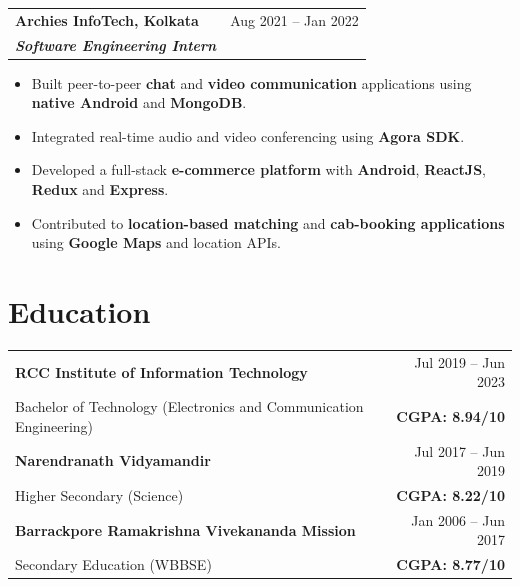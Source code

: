 \documentclass[a4paper,8pt]{article}
\begin{document}
\vspace{6pt}

\begin{tabularx}{\linewidth}{@{} X r @{}}
\textbf{Archies InfoTech, Kolkata} & \color[HTML]{371e77} Aug 2021 -- Jan 2022\\
\textit{\textbf{Software Engineering Intern}} &
\end{tabularx}

\begin{itemize}[leftmargin=2em,itemsep=4pt]
\item Built peer-to-peer \textbf{chat} and \textbf{video communication} applications using \textbf{native Android} and \textbf{MongoDB}.
\item Integrated real-time audio and video conferencing using \textbf{Agora SDK}.
\item Developed a full-stack \textbf{e-commerce platform} with \textbf{Android}, \textbf{ReactJS}, \textbf{Redux} and \textbf{Express}.
\item Contributed to \textbf{location-based matching} and \textbf{cab-booking applications} using \textbf{Google Maps} and location APIs.
\end{itemize}


\vspace{6pt}
\section{Education}

\begin{tabularx}{\linewidth}{@{} X r @{}}
\textbf{RCC Institute of Information Technology} & \color[HTML]{371e77} Jul 2019 -- Jun 2023\\
Bachelor of Technology (Electronics and Communication Engineering) & \textbf{CGPA: 8.94/10}\\[6pt]

\textbf{Narendranath Vidyamandir} & \color[HTML]{371e77} Jul 2017 -- Jun 2019\\
Higher Secondary (Science) & \textbf{CGPA: 8.22/10}\\[6pt]

\textbf{Barrackpore Ramakrishna Vivekananda Mission} & \color[HTML]{371e77} Jan 2006 -- Jun 2017\\
Secondary Education (WBBSE) & \textbf{CGPA: 8.77/10}
\end{tabularx}
\end{document}
